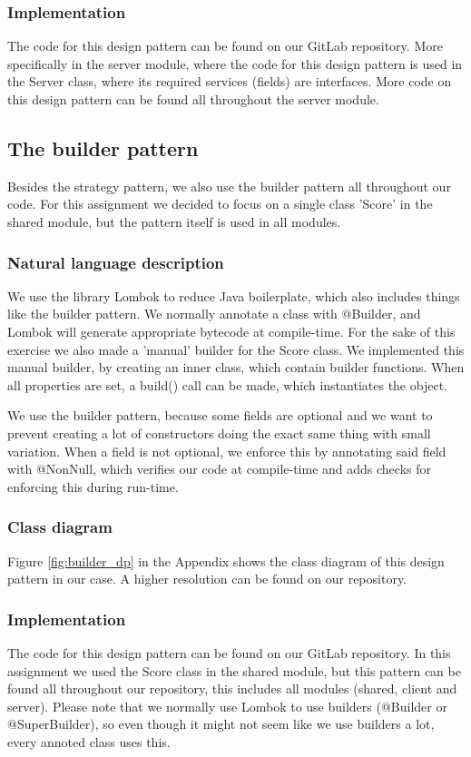 \documentclass{article}
\begin{document}
\subsubsection{Implementation}
The code for this design pattern can be found on our GitLab repository. More specifically in the server module, where the code for this design pattern is used in the Server class, where its required services (fields) are interfaces. More code on this design pattern can be found all throughout the server module.

\subsection{The builder pattern}
Besides the strategy pattern, we also use the builder pattern all throughout our code. For this assignment we decided to focus on a single class 'Score' in the shared module, but the pattern itself is used in all modules.

\subsubsection{Natural language description}
We use the library Lombok to reduce Java boilerplate, which also includes things like the builder pattern.
We normally annotate a class with @Builder, and Lombok will generate appropriate
bytecode at compile-time. For the sake of this exercise we also made a
'manual' builder for the Score class. We implemented this manual builder,
by creating an inner class, which contain builder functions. When all
properties are set, a build() call can be made, which instantiates the object.

\par We use the builder pattern, because some fields are optional and we want to
prevent creating a lot of constructors doing the exact same thing with small
variation. When a field is not optional, we enforce this by annotating said
field with @NonNull, which verifies our code at compile-time and adds checks
for enforcing this during run-time.

\subsubsection{Class diagram}
Figure \ref{fig:builder_dp} in the Appendix shows the class diagram of this design pattern in our case. A higher resolution can be found on our repository.

\subsubsection{Implementation}
The code for this design pattern can be found on our GitLab repository. In this assignment we used the Score class in the shared module, but this pattern can be found all throughout our repository, this includes all modules (shared, client and server). Please note that we normally use Lombok to use builders (@Builder or @SuperBuilder), so even though it might not seem like we use builders a lot, every annoted class uses this.
\end{document}
